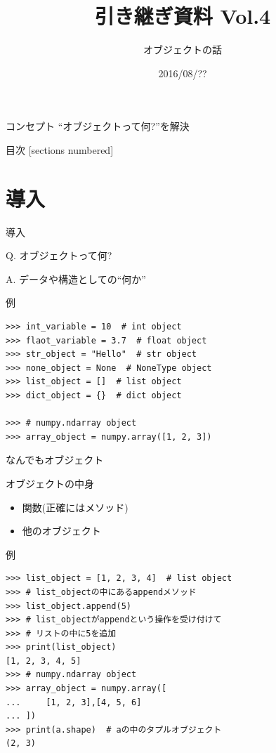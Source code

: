 \documentclass[12pt, xetex, xcolor=pdftex, dvipsnames]{beamer}
\title{引き継ぎ資料 Vol.4}
\subtitle{オブジェクトの話}
\date{2016/08/??}
\author{}
\institute{}
\begin{document}
\maketitle
\begin{frame}{コンセプト}
    ``オブジェクトって何?''を解決
\end{frame}
\begin{frame}{目次}
  [sections numbered]
  \tableofcontents[hideallsubsections]
\end{frame}

\section{導入}
\begin{frame}{導入}
    \begin{block}{Q.}
        {\Large オブジェクトって何?}
    \end{block}
    \pause
    \begin{alertblock}{A.}
        データや構造としての{\Large ``何か''}
    \end{alertblock}
\end{frame}
\begin{frame}[fragile]{例}
\begin{lstlisting}
>>> int_variable = 10  # int object
>>> flaot_variable = 3.7  # float object
>>> str_object = "Hello"  # str object
>>> none_object = None  # NoneType object
>>> list_object = []  # list object
>>> dict_object = {}  # dict object

>>> # numpy.ndarray object
>>> array_object = numpy.array([1, 2, 3])
\end{lstlisting}
\pause
なんでもオブジェクト
\end{frame}
\begin{frame}{オブジェクトの中身}
\begin{itemize}
    \item 関数(正確にはメソッド)
    \item 他のオブジェクト
\end{itemize}
\end{frame}
\begin{frame}[fragile]{例}
\begin{lstlisting}
>>> list_object = [1, 2, 3, 4]  # list object
>>> # list_objectの中にあるappendメソッド
>>> list_object.append(5)
>>> # list_objectがappendという操作を受け付けて
>>> # リストの中に5を追加
>>> print(list_object)
[1, 2, 3, 4, 5]
>>> # numpy.ndarray object
>>> array_object = numpy.array([
...     [1, 2, 3],[4, 5, 6]
... ])
>>> print(a.shape)  # aの中のタプルオブジェクト
(2, 3)
\end{lstlisting}
\end{frame}
\end{document}
